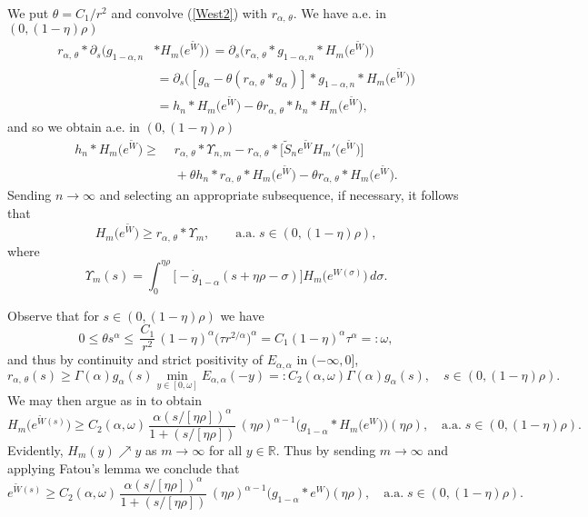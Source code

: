 \documentclass[10pt]{article}
\newcommand{\iR}{\mathbb{R}}
\begin{document}
We put $\theta=C_1/r^2$ and convolve (\ref{West2}) with
$r_{\alpha,\,\theta}$. We have a.e. in $(0,(1-\eta)\rho)$
\begin{align*}
r_{\alpha,\,\theta}\ast \partial_s\Big(g_{1-\alpha,n} & \ast
H_m\big(e^{\tilde{W}}\big)\Big)\,=\partial_s\Big(r_{\alpha,\,\theta}\ast
g_{1-\alpha,n}\ast H_m\big(e^{\tilde{W}}\big)\Big)\\
&\,=\partial_s\Big([g_\alpha-\theta (r_{\alpha,\,\theta}\ast
g_\alpha)]\ast g_{1-\alpha,n}\ast H_m\big(e^{\tilde{W}}\big)\Big)\\
&\,=h_n\ast H_m\big(e^{\tilde{W}}\big) -\theta
r_{\alpha,\,\theta}\ast h_n\ast H_m\big(e^{\tilde{W}}\big),
\end{align*}
and so we obtain a.e. in $(0,(1-\eta)\rho)$
\begin{align} \label{West3}
h_n\ast H_m\big(e^{\tilde{W}}\big)\ge &
\,\,r_{\alpha,\,\theta}\ast \Upsilon_{n,m}-
r_{\alpha,\,\theta}\ast\big[\tilde{S}_n
e^{\tilde{W}} H_m'\big(e^{\tilde{W}}\big)\big]\nonumber\\
& \,\,+\theta h_n\ast r_{\alpha,\,\theta}\ast
H_m\big(e^{\tilde{W}}\big) -\theta r_{\alpha,\,\theta}\ast
H_m\big(e^{\tilde{W}}\big).
\end{align}
Sending $n\to \infty$ and selecting an appropriate subsequence, if
necessary, it follows that
\begin{equation} \label{West4}
H_m\big(e^{\tilde{W}}\big)\ge r_{\alpha,\,\theta}\ast
\Upsilon_{m},\quad\quad \mbox{a.a.}\;s\in(0,(1-\eta)\rho),
\end{equation}
where
\[
\Upsilon_{m}(s)=\int_0^{\eta\rho}\big[-\dot{g}_{1-\alpha}(s+\eta\rho-\sigma)\big]
H_m\big(e^{W(\sigma)}\big)\,d\sigma.
\]

Observe that for $s\in (0,(1-\eta)\rho)$ we have
\[
0\le \theta s^\alpha\le \,\frac{C_1}{r^2}\,(1-\eta)^\alpha \big(\tau
r^{2/\alpha}\big)^\alpha=C_1(1-\eta)^\alpha\tau^\alpha=:\omega,
\]
and thus by continuity and strict positivity of $E_{\alpha,\alpha}$
in $(-\infty,0]$,
\[
r_{\alpha,\,\theta}(s)\ge  \Gamma(\alpha) g_\alpha(s)\min_{y\in
[0,\omega]} E_{\alpha,\alpha}(-y)=:C_2(\alpha,\omega)\Gamma(\alpha)
g_\alpha(s),\quad s\in (0,(1-\eta)\rho).
\]
We may then argue as in \cite[Section 2.1]{Za} to obtain
\[
H_m\big(e^{\tilde{W}(s)}\big)\ge C_2(\alpha,\omega)\,\frac{\alpha
(s/[\eta\rho])^\alpha}{1+(s/[\eta\rho])}\,(\eta\rho)^{\alpha-1}\big(g_{1-\alpha}\ast
H_m\big(e^{W}\big)\big) (\eta\rho),\quad \mbox{a.a.}\;s\in
(0,(1-\eta)\rho).
\]
Evidently, $H_m(y)\nearrow y$ as $m\to \infty$ for all $y\in \iR$.
Thus by sending $m\to \infty$ and applying Fatou's lemma we conclude
that
\begin{equation} \label{West5}
e^{\tilde{W}(s)}\ge C_2(\alpha,\omega)\,\frac{\alpha
(s/[\eta\rho])^\alpha}{1+(s/[\eta\rho])}\,(\eta\rho)^{\alpha-1}\big(g_{1-\alpha}\ast
e^{W}\big) (\eta\rho),\quad \mbox{a.a.}\;s\in (0,(1-\eta)\rho).
\end{equation}
\end{document}
